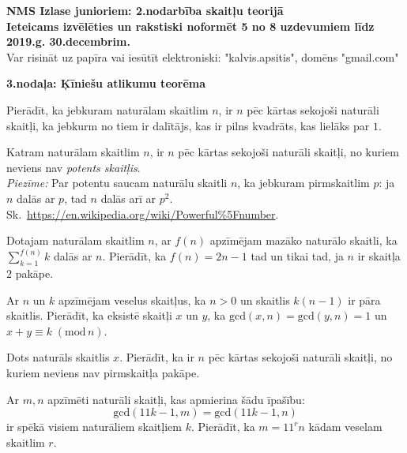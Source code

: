 \documentclass[11pt]{article}
\begin{document}
\begin{center}
{\Large \bf NMS Izlase junioriem: 2.nodarbība skaitļu teorijā}\\
{\bf Ieteicams izvēlēties un rakstiski noformēt 
5 no 8 uzdevumiem līdz 2019.g. 30.decembrim.}\\
{Var risināt uz papīra vai iesūtīt elektroniski: "kalvis.apsitis", domēns "gmail.com"}
\end{center}

\vspace{10pt}
{\bf \large 3.nodaļa: Ķīniešu atlikumu teorēma}

\begin{problem}
Pierādīt, ka jebkuram naturālam skaitlim $n$, ir $n$ pēc kārtas sekojoši 
naturāli skaitļi, ka jebkurm no tiem ir dalītājs, kas ir pilns kvadrāts, kas lielāks par $1$. 
\end{problem}

\begin{problem}
Katram naturālam skaitlim $n$, ir $n$ pēc kārtas sekojoši naturāli skaitļi, no kuriem neviens
nav {\em potents skaitļis}.\\
{\em Piezīme:} Par potentu saucam naturālu skaitli $n$, ka jebkuram pirmskaitlim $p$: ja $n$ dalās 
ar $p$, tad $n$ dalās arī ar $p^2$. Sk.\ \url{https://en.wikipedia.org/wiki/Powerful\%5Fnumber}.
\end{problem}

\begin{problem}
Dotajam naturālam skaitlim $n$, ar $f(n)$ apzīmējam mazāko naturālo skaitli, ka 
${\displaystyle \sum\limits_{k=1}^{f(n)} k}$ dalās ar $n$. 
Pierādīt, ka $f(n) = 2n-1$ tad un tikai tad, ja $n$ ir skaitļa $2$ pakāpe.
\end{problem}

\begin{problem}
Ar $n$ un $k$ apzīmējam veselus skaitļus, ka $n>0$ un skaitlis $k(n-1)$ ir pāra skaitlis. 
Pierādīt, ka eksistē skaitļi $x$ un $y$, ka $\text{gcd}(x,n) = \text{gcd}(y,n) = 1$ un 
$x + y \equiv k\;(\text{mod}\,n)$. 
\end{problem}

\begin{problem}
Dots naturāls skaitlis $x$. Pierādīt, ka ir $n$ pēc kārtas sekojoši naturāli skaitļi, 
no kuriem neviens nav pirmskaitļa pakāpe. 
\end{problem}


\begin{problem}
Ar $m, n$ apzīmēti naturāli skaitļi, kas apmierina šādu īpašību:
$$ \text{gcd}(11k-1,m) = \text{gcd}(11k-1,n)$$
ir spēkā visiem naturāliem skaitļiem $k$. Pierādīt, ka $m = 11^rn$ kādam veselam skaitlim $r$. 
\end{problem}
\end{document}
